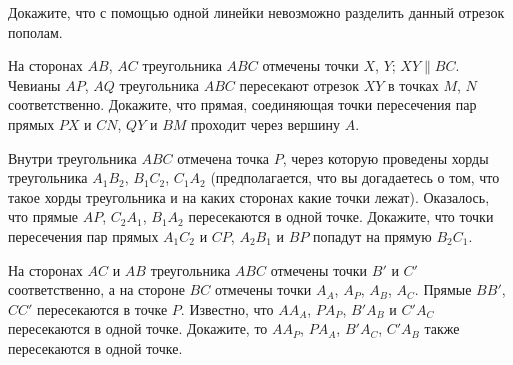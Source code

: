\begin{problems}
\item
Докажите, что с помощью одной линейки невозможно разделить данный отрезок
пополам.

\item
На сторонах $AB$, $AC$ треугольника $ABC$ отмечены точки $X$, $Y$;
$XY \parallel BC$.
Чевианы $AP$, $AQ$ треугольника $ABC$ пересекают отрезок $XY$ в точках $M$, $N$
соответственно.
Докажите, что прямая, соединяющая точки пересечения пар прямых $PX$ и $CN$,
$QY$ и $BM$ проходит через вершину $A$.

\item
Внутри треугольника $ABC$ отмечена точка $P$, через которую проведены хорды
треугольника $A_1 B_2$, $B_1 C_2$, $C_1 A_2$
(предполагается, что вы догадаетесь о том, что такое хорды треугольника и на
каких сторонах какие точки лежат).
Оказалось, что прямые $A P$, $C_2 A_1$, $B_1 A_2$ пересекаются в одной точке.
Докажите, что точки пересечения пар прямых $A_1 C_2$ и $CP$, $A_2 B_1$ и $BP$
попадут на прямую $B_2 C_1$.

\item
На сторонах $AC$ и $AB$ треугольника $ABC$ отмечены точки $B'$ и $C'$
соответственно,
а на стороне $BC$ отмечены точки $A_A$, $A_P$, $A_B$, $A_C$.
Прямые $B B'$, $C C'$ пересекаются в точке $P$.
Известно, что $A A_A$, $P A_P$, $B' A_B$ и $C' A_C$ пересекаются в одной точке.
Докажите, то $A A_P$, $P A_A$, $B' A_C$, $C' A_B$ также пересекаются в одной
точке.

\end{problems}

